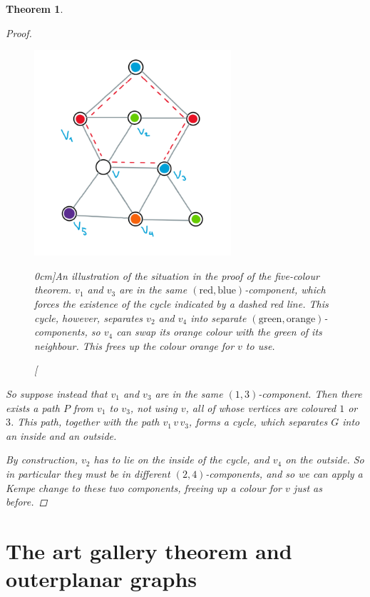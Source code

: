 \documentclass[nobib]{tufte-handout}
\newtheorem{theorem}{Theorem}
\begin{document}
\begin{theorem}
\begin{proof}
    \begin{figure}
      \centering
      \includegraphics[width=0.65\textwidth]{graphics/L12_colouring/planar_five_colour.png}
      \caption[][0cm]{An illustration of the situation in the proof of the five-colour theorem. $v_1$ and $v_3$ are in the same $(\text{red},\text{blue})$-component, which forces the existence of the cycle indicated by a dashed red line. This cycle, however, separates $v_2$ and $v_4$ into separate $(\text{green},\text{orange})$-components, so $v_4$ can swap its orange colour with the green of its neighbour. This frees up the colour orange for $v$ to use.}
      \label{fig:planar_five_colour}
    \end{figure}

    So suppose instead that $v_1$ and $v_3$ are in the same $(1,3)$-component. Then there exists a path $P$ from $v_1$ to $v_3$, not using $v$, all of whose vertices are coloured $1$ or $3$. This path, together with the path $v_1\, v\, v_3$, forms a cycle, which separates $G$ into an inside and an outside.

    By construction, $v_2$ has to lie on the inside of the cycle, and $v_4$ on the outside. So in particular they must be in different $(2,4)$-components, and so we can apply a Kempe change to these two components, freeing up a colour for $v$ just as before.
  \end{proof}
\end{theorem}

\section{The art gallery theorem and outerplanar graphs}
\end{document}
